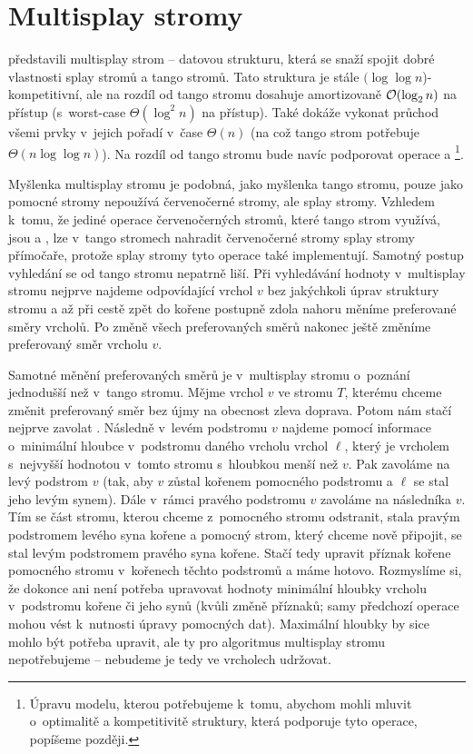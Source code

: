 \section{Multisplay stromy}

\citet{multisplay} představili multisplay strom -- datovou strukturu, která se
snaží spojit dobré vlastnosti splay stromů a tango stromů. Tato struktura je
stále $(\log\log n$)-kompetitivní, ale na rozdíl od tango stromu dosahuje
amortizovaně $\o(\log n)$ na přístup (s~worst-case $\Theta(\log^2 n)$ na
přístup). Také dokáže vykonat průchod všemi prvky v~jejich pořadí v~čase
$\Theta(n)$ (na což tango strom potřebuje $\Theta(n\log\log n)$). Na rozdíl
od tango stromu bude navíc podporovat operace  a \footnote{Úpravu modelu,
kterou potřebujeme k~tomu, abychom mohli mluvit o~optimalitě a kompetitivitě
struktury, která podporuje tyto operace, popíšeme později.}.

Myšlenka multisplay stromu je podobná, jako myšlenka tango stromu, pouze jako
pomocné stromy nepoužívá červenočerné stromy, ale splay stromy. Vzhledem
k~tomu, že jediné operace červenočerných stromů, které tango strom využívá, jsou
 a , lze v~tango stromech nahradit červenočerné stromy
splay stromy přímočaře, protože splay stromy tyto operace také implementují.
Samotný postup vyhledání se od tango stromu nepatrně liší. Při vyhledávání
hodnoty v~multisplay stromu nejprve najdeme odpovídající vrchol $v$ bez
jakýchkoli úprav struktury stromu a až při cestě zpět do kořene postupně
zdola nahoru měníme preferované směry vrcholů. Po změně všech preferovaných
směrů nakonec ještě změníme preferovaný směr vrcholu $v$.

Samotné měnění preferovaných směrů je v~multisplay stromu o~poznání jednodušší než v~tango stromu.
Mějme vrchol $v$ ve stromu $T$, kterému chceme změnit preferovaný směr bez újmy
na obecnost zleva doprava. Potom nám stačí nejprve zavolat .
Následně v~levém podstromu $v$ najdeme pomocí informace o~minimální hloubce
v~podstromu daného vrcholu vrchol $\ell$, který je vrcholem s~nejvyšší hodnotou
v~tomto stromu s~hloubkou menší než $v$. Pak zavoláme  na levý
podstrom $v$ (tak, aby $v$ zůstal kořenem pomocného podstromu a $\ell$ se
stal jeho levým synem). Dále v~rámci pravého podstromu $v$ zavoláme 
na následníka $v$. Tím se část stromu, kterou chceme z~pomocného stromu
odstranit, stala pravým podstromem levého syna kořene a pomocný strom, který
chceme nově připojit, se stal levým podstromem pravého syna kořene. Stačí tedy
upravit příznak kořene pomocného stromu v~kořenech těchto podstromů a máme
hotovo. Rozmyslíme si, že dokonce ani není potřeba upravovat hodnoty minimální
hloubky vrcholu v~podstromu kořene či jeho synů (kvůli změně příznaků; samy
předchozí operace  mohou vést k~nutnosti úpravy pomocných dat).
Maximální hloubky by sice mohlo být potřeba upravit, ale ty pro algoritmus
multisplay stromu nepotřebujeme -- nebudeme je tedy ve vrcholech
udržovat.

